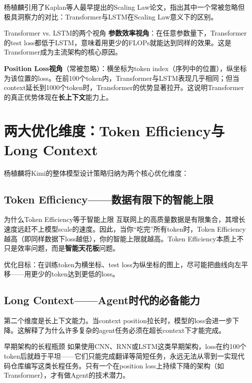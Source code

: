 \documentclass[a4paper]{article}
\begin{document}
杨植麟引用了Kaplan等人最早提出的Scaling Law论文，指出其中一个常被忽略但极具洞察力的对比：Transformer与LSTM在Scaling Law意义下的区别。

\begin{knowledgebox}{Transformer vs. LSTM的两个视角}
\textbf{参数效率视角}：在任意参数量下，Transformer的test loss都低于LSTM，意味着用更少的FLOPs就能达到同样的效果。这是Transformer成为主流架构的核心原因。

\textbf{Position Loss视角}（常被忽略）：横坐标为token index（序列中的位置），纵坐标为该位置的loss。在前100个token内，Transformer与LSTM表现几乎相同；但当context延长到1000个token时，Transformer的优势显著拉开。这说明Transformer的真正优势体现在\textbf{长上下文}能力上。
\end{knowledgebox}


\section{两大优化维度：Token Efficiency与Long Context}

杨植麟将Kimi的整体模型设计策略归纳为两个核心优化维度：

\subsection{Token Efficiency——数据有限下的智能上限}

\begin{importantbox}{为什么Token Efficiency等于智能上限}
互联网上的高质量数据是有限集合，其增长速度远赶不上模型scale的速度。因此，当你``吃完''所有token时，Token Efficiency越高（即同样数据下loss越低），你的智能上限就越高。Token Efficiency本质上不只是效率问题，而是\textbf{智能天花板}问题。
\end{importantbox}

优化目标：在训练token为横坐标、test loss为纵坐标的图上，尽可能把曲线向左平移——用更少的token达到更低的loss。

\subsection{Long Context——Agent时代的必备能力}

第二个维度是长上下文能力。当context position拉长时，模型的loss会进一步下降。这解释了为什么许多复杂的agent任务必须在超长context下才能完成。

\begin{warningbox}{早期架构的长程瓶颈}
如果使用CNN、RNN或LSTM这类早期架构，loss在约100个token后就趋于平坦——它们只能完成翻译等简短任务，永远无法从零到一实现代码仓库编写这类长程任务。只有一个在position loss上持续下降的架构（如Transformer），才有做Agent的技术潜力。
\end{warningbox}
\end{document}

